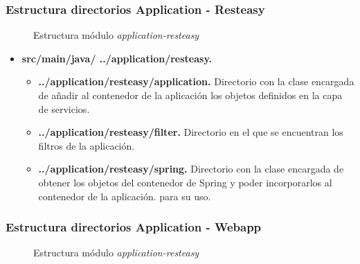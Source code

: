 \subsubsection*{Estructura directorios Application - Resteasy}
\begin{figure}[H]
\centering
{}
\caption{Estructura módulo \textit{application-resteasy}}
\end{figure}

\begin{itemize}
	\item \textbf{src/main/java/ ../application/resteasy. }
	\begin{itemize}
		\item \textbf{../application/resteasy/application. } Directorio con la clase encargada de añadir al contenedor de la aplicación los objetos definidos en la capa de servicios.		
		\item \textbf{../application/resteasy/filter. } Directorio en el que se encuentran los filtros de la aplicación.
		\item \textbf{../application/resteasy/spring. } Directorio con la clase encargada de obtener los objetos del contenedor de Spring y poder incorporarlos al contenedor de la aplicación. para su uso.
	\end{itemize}
\end{itemize}



\subsubsection*{Estructura directorios Application - Webapp}
\begin{figure}[H]
\centering
{}
\caption{Estructura módulo \textit{application-resteasy}}
\end{figure}

